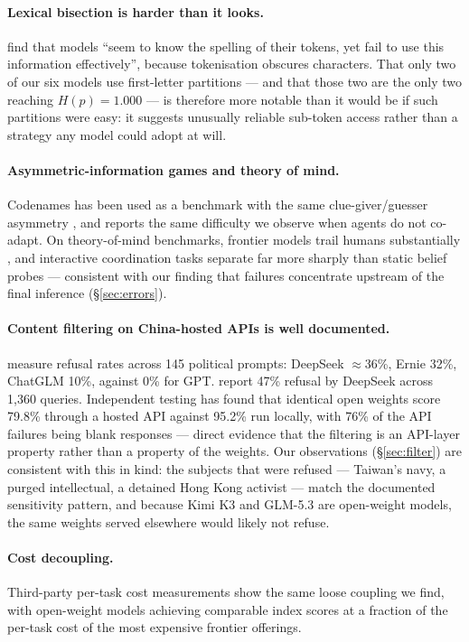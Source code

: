 \documentclass[11pt]{article}
\begin{document}
\paragraph{Lexical bisection is harder than it looks.} \citet{edman2024cute}
find that models ``seem to know the spelling of their tokens, yet fail to use
this information effectively'', because tokenisation obscures characters. That
only two of our six models use first-letter partitions --- and that those two
are the only two reaching $H(p)=1.000$ --- is therefore more notable than it
would be if such partitions were easy: it suggests unusually reliable
sub-token access rather than a strategy any model could adopt at will.

\paragraph{Asymmetric-information games and theory of mind.} Codenames has been
used as a benchmark with the same clue-giver/guesser asymmetry
\citep{stephenson2024codenames}, and reports the same difficulty we observe
when agents do not co-adapt. On theory-of-mind benchmarks, frontier models
trail humans substantially \citep{xu2024tombench}, and interactive
coordination tasks separate far more sharply than static belief probes ---
consistent with our finding that failures concentrate upstream of the final
inference (\S\ref{sec:errors}).

\paragraph{Content filtering on China-hosted APIs is well documented.}
\citet{pan2026censorship} measure refusal rates across 145 political prompts:
DeepSeek $\approx$36\%, Ernie 32\%, ChatGLM 10\%, against 0\% for GPT.
\citet{yang2025moderation} report 47\% refusal by DeepSeek across 1{,}360
queries. Independent testing has found that identical open weights score
79.8\% through a hosted API against 95.2\% run locally, with 76\% of the API
failures being blank responses --- direct evidence that the filtering is an
API-layer property rather than a property of the weights. Our observations
(\S\ref{sec:filter}) are consistent with this in kind: the subjects that were
refused --- Taiwan's navy, a purged intellectual, a detained Hong Kong activist
--- match the documented sensitivity pattern, and because Kimi K3 and GLM-5.3
are open-weight models, the same weights served elsewhere would likely not
refuse.

\paragraph{Cost decoupling.} Third-party per-task cost measurements show the
same loose coupling we find, with open-weight models achieving comparable index
scores at a fraction of the per-task cost of the most expensive frontier
offerings.
\end{document}
